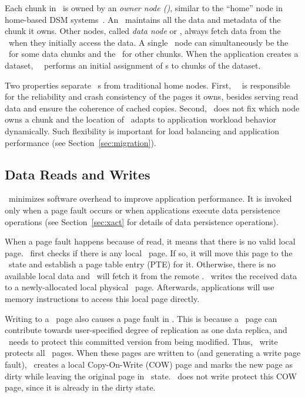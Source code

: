 Each chunk in \hotpot\ is owned by an {\em owner node (\on)},
similar to the ``home'' node in home-based DSM systems~\cite{HLRC}.
An \on\ maintains all the data and metadata of the chunk it owns.
Other nodes, called {\em data node} or {\em \dn}, always fetch data from the \on\
when they initially access the data.
A single \hotpot\ node can simultaneously be the \on\ for some data chunks and the \dn\ for other chunks.
When the application creates a dataset, 
\hotpot\ \cd\ performs an initial assignment of \on{}s to chunks of the dataset.

Two properties separate \hotpot\ \on{}s from traditional home nodes.
First, %
\hotpot\ \on\ is responsible for the reliability and crash consistency of the pages it owns,
besides serving read data and ensure the coherence of cached copies.
Second, \hotpot\ does not fix which node owns a chunk
and the location of \on\ adapts to application workload behavior dynamically.
Such flexibility is important for load balancing and application performance (see Section~\ref{sec:migration}).

\subsection{Data Reads and Writes}
\label{sec:readwrite}

\hotpot\ minimizes software overhead to improve application performance.
It is invoked only when a page fault occurs or when 
applications execute data persistence operations (see Section~\ref{sec:xact} for details of data persistence operations).


When a page fault happens because of read, 
it means that there is no valid local page.
\hotpot\ first checks if there is any local \redundant\ page.
If so, it will move this page to the \committed\ state and establish a page table entry (PTE) for it.
Otherwise, there is no available local data and 
\hotpot\ will fetch it from the remote \on.
\hotpot\ writes the received data to a newly-allocated local physical \nvm\ page.
Afterwards, applications will use memory instructions to access this local page directly.


Writing to a \committed\ page also causes a page fault in \hotpot. 
This is because a \committed\ page can contribute towards user-specified degree of replication as one data replica,
and \hotpot\ needs to protect this committed version from being modified.
Thus, \hotpot\ write protects all \committed\ pages.
When these pages are written to (and generating a write page fault), 
\hotpot\ creates a local Copy-On-Write (COW) page
and marks the new page as dirty while leaving
the original page in \committed\ state.
\hotpot\ does not write protect this COW page, since it is already in the dirty state.

